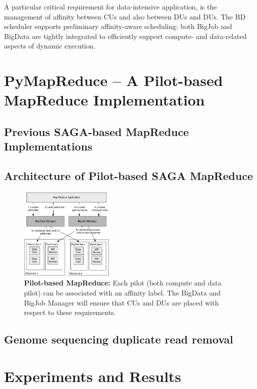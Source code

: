 \documentclass{acm_proc_article-sp}
\begin{document}
A particular critical requirement for data-intensive application, is
the management of affinity between CUs and also between DUs and
DUs. The BD scheduler supports preliminary affinity-aware
scheduling: both BigJob and BigData are tightly integrated to
efficiently support compute- and data-related aspects of dynamic
execution.


\section{PyMapReduce -- A Pilot-based MapReduce Implementation}

\subsection{Previous SAGA-based MapReduce Implementations}



\subsection{Architecture of Pilot-based SAGA MapReduce}

\begin{figure}[htbp]
	\centering
	\includegraphics[width=0.4\textwidth]{figures/mapreduce-pilotdata.pdf}
	\caption{\textbf{Pilot-based MapReduce:} Each pilot (both compute and data 
	pilot) can be associated with an affinity label. The BigData and BigJob 
	Manager will ensure that CUs and DUs are placed with respect to these 
	requirements.}
	\label{fig:figures_mapreduce-pilotdata}
\end{figure}

\subsection{Genome sequencing duplicate read removal}


\section{Experiments and Results}
\end{document}
